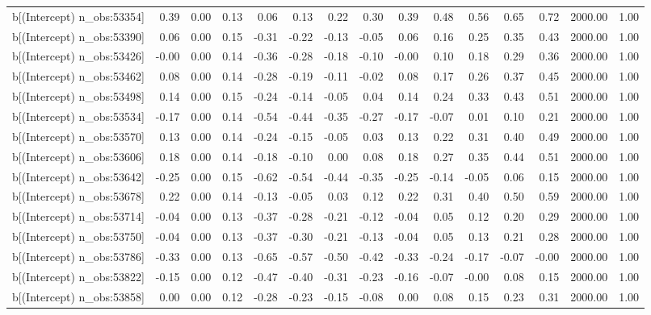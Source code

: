 \begin{table}[ht]
\begin{tabular}{rrrrrrrrrrrrrrr}
  b[(Intercept) n\_obs:53354] & 0.39 & 0.00 & 0.13 & 0.06 & 0.13 & 0.22 & 0.30 & 0.39 & 0.48 & 0.56 & 0.65 & 0.72 & 2000.00 & 1.00 \\ 
  b[(Intercept) n\_obs:53390] & 0.06 & 0.00 & 0.15 & -0.31 & -0.22 & -0.13 & -0.05 & 0.06 & 0.16 & 0.25 & 0.35 & 0.43 & 2000.00 & 1.00 \\ 
  b[(Intercept) n\_obs:53426] & -0.00 & 0.00 & 0.14 & -0.36 & -0.28 & -0.18 & -0.10 & -0.00 & 0.10 & 0.18 & 0.29 & 0.36 & 2000.00 & 1.00 \\ 
  b[(Intercept) n\_obs:53462] & 0.08 & 0.00 & 0.14 & -0.28 & -0.19 & -0.11 & -0.02 & 0.08 & 0.17 & 0.26 & 0.37 & 0.45 & 2000.00 & 1.00 \\ 
  b[(Intercept) n\_obs:53498] & 0.14 & 0.00 & 0.15 & -0.24 & -0.14 & -0.05 & 0.04 & 0.14 & 0.24 & 0.33 & 0.43 & 0.51 & 2000.00 & 1.00 \\ 
  b[(Intercept) n\_obs:53534] & -0.17 & 0.00 & 0.14 & -0.54 & -0.44 & -0.35 & -0.27 & -0.17 & -0.07 & 0.01 & 0.10 & 0.21 & 2000.00 & 1.00 \\ 
  b[(Intercept) n\_obs:53570] & 0.13 & 0.00 & 0.14 & -0.24 & -0.15 & -0.05 & 0.03 & 0.13 & 0.22 & 0.31 & 0.40 & 0.49 & 2000.00 & 1.00 \\ 
  b[(Intercept) n\_obs:53606] & 0.18 & 0.00 & 0.14 & -0.18 & -0.10 & 0.00 & 0.08 & 0.18 & 0.27 & 0.35 & 0.44 & 0.51 & 2000.00 & 1.00 \\ 
  b[(Intercept) n\_obs:53642] & -0.25 & 0.00 & 0.15 & -0.62 & -0.54 & -0.44 & -0.35 & -0.25 & -0.14 & -0.05 & 0.06 & 0.15 & 2000.00 & 1.00 \\ 
  b[(Intercept) n\_obs:53678] & 0.22 & 0.00 & 0.14 & -0.13 & -0.05 & 0.03 & 0.12 & 0.22 & 0.31 & 0.40 & 0.50 & 0.59 & 2000.00 & 1.00 \\ 
  b[(Intercept) n\_obs:53714] & -0.04 & 0.00 & 0.13 & -0.37 & -0.28 & -0.21 & -0.12 & -0.04 & 0.05 & 0.12 & 0.20 & 0.29 & 2000.00 & 1.00 \\ 
  b[(Intercept) n\_obs:53750] & -0.04 & 0.00 & 0.13 & -0.37 & -0.30 & -0.21 & -0.13 & -0.04 & 0.05 & 0.13 & 0.21 & 0.28 & 2000.00 & 1.00 \\ 
  b[(Intercept) n\_obs:53786] & -0.33 & 0.00 & 0.13 & -0.65 & -0.57 & -0.50 & -0.42 & -0.33 & -0.24 & -0.17 & -0.07 & -0.00 & 2000.00 & 1.00 \\ 
  b[(Intercept) n\_obs:53822] & -0.15 & 0.00 & 0.12 & -0.47 & -0.40 & -0.31 & -0.23 & -0.16 & -0.07 & -0.00 & 0.08 & 0.15 & 2000.00 & 1.00 \\ 
  b[(Intercept) n\_obs:53858] & 0.00 & 0.00 & 0.12 & -0.28 & -0.23 & -0.15 & -0.08 & 0.00 & 0.08 & 0.15 & 0.23 & 0.31 & 2000.00 & 1.00 \\ 

\end{tabular}
\end{table}
